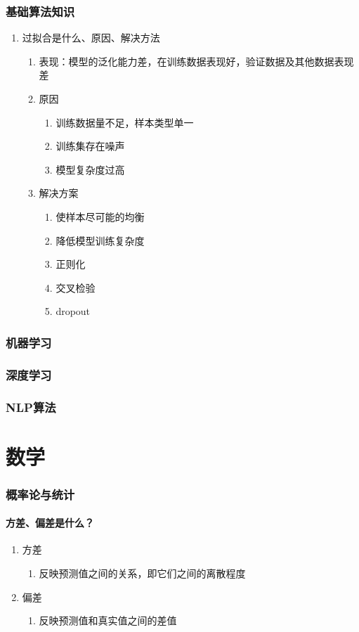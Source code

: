 \documentclass{paper}
\begin{document}
	\section{基础算法知识}
	\begin{enumerate}
		\item 过拟合是什么、原因、解决方法
		\begin{enumerate}
			\item 表现：模型的泛化能力差，在训练数据表现好，验证数据及其他数据表现差
			\item 原因
			\begin{enumerate}
				\item 训练数据量不足，样本类型单一
				\item 训练集存在噪声
				\item 模型复杂度过高
			\end{enumerate}
			\item 解决方案
			\begin{enumerate}
				\item 使样本尽可能的均衡
				\item 降低模型训练复杂度
				\item 正则化
				\item 交叉检验
				\item dropout
			\end{enumerate} 
		\end{enumerate}
	\end{enumerate}
	\section{机器学习}
	\section{深度学习}
	\section{NLP算法}
	
	\part{数学}
	\section{概率论与统计}
	\subsection{方差、偏差是什么？}
	\begin{enumerate}
		\item 方差
		\begin{enumerate}
			\item 反映预测值之间的关系，即它们之间的离散程度
		\end{enumerate} 
		\item 偏差
		\begin{enumerate}
			\item 反映预测值和真实值之间的差值
		\end{enumerate}
	\end{enumerate}
	
\end{document}
